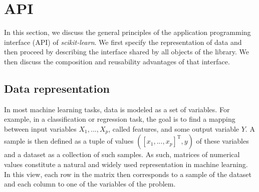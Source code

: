 \documentclass{llncs}
\newcommand{\sklearn}{\textit{scikit-learn}\xspace}
\begin{document}



\section{API}

\label{sec:api}

In this section, we discuss the general principles of the application
programming interface (API) of \sklearn. We first specify the
representation of data and then proceed by describing the interface shared by
all objects of the library. We then discuss the composition and reusability
advantages of that interface.

\subsection{Data representation}

In most machine learning tasks, data is modeled as a set of variables.  For
example, in a classification or regression task, the goal is to find a mapping
between input variables $X_1, ..., X_p$, called features, and
some output variable $Y$. A sample is then defined as a tuple of values $([x_1,
..., x_p]^\mathrm{T}, y)$ of these variables and a dataset as a collection of
such samples.  As such, matrices of numerical values constitute a natural and
widely used representation in machine learning. In this view, each row in the
matrix then corresponds to a sample of the dataset and each column to one of the
variables of the problem.
\end{document}
